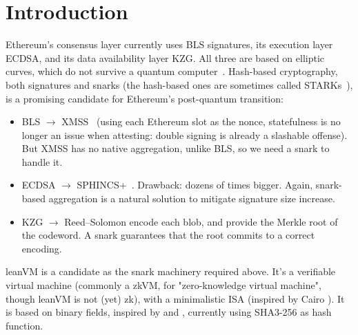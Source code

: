 \section{Introduction}\label{sec:intro}

Ethereum's consensus layer currently uses BLS signatures, its execution layer ECDSA, and its data availability layer KZG. All three are based on elliptic curves, which do not survive a quantum computer~\cite{shor}. Hash-based cryptography, both signatures and snarks (the hash-based ones are sometimes called STARKs~\cite{stark}), is a promising candidate for Ethereum's post-quantum transition:
\begin{itemize}[itemsep=1pt,topsep=3pt]
\item BLS $\to$ XMSS~\cite{rfc8391} (using each Ethereum slot as the nonce, statefulness is no longer an issue when attesting: double signing is already a slashable offense). But XMSS has no native aggregation, unlike BLS, so we need a snark to handle it.
\item ECDSA $\to$ SPHINCS+~\cite{sphincs}. Drawback: dozens of times bigger. Again, snark-based aggregation is a natural solution to mitigate signature size increase.
\item KZG $\to$ Reed--Solomon encode each blob, and provide the Merkle root of the codeword. A snark guarantees that the root commits to a correct encoding.
\end{itemize}

\vspace{4mm}

leanVM is a candidate as the snark machinery required above. It's a verifiable virtual machine (commonly a zkVM, for "zero-knowledge virtual machine", though leanVM is not (yet) zk), with a minimalistic ISA (inspired by Cairo \cite{cairo}). It is based on binary fields, inspired by \cite{DP24} and \cite{Flock26}, currently using SHA3-256 \cite{fips202} as hash function.
